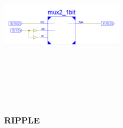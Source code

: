 \documentclass{article}
\begin{document}
\includegraphics[width=6cm, height=8cm]{mux2to1.png}
\pagebreak



\subsubsection{RIPPLE}\label{sec:result}
\end{document}
